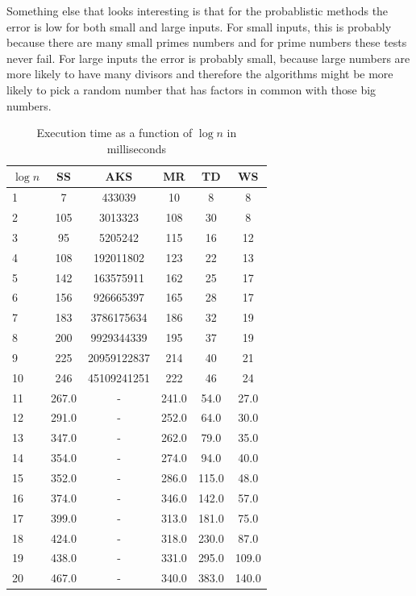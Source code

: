 Something else that looks interesting is that for the probablistic methods the error is low for both small and large inputs.
For small inputs, this is probably because there are many small primes numbers and for prime numbers these tests never fail. %
For large inputs the error is probably small, because large numbers are more likely to have many divisors and therefore the algorithms might be more likely to pick a random number that has factors in common with those big numbers.

\begin{table}
    \centering
    \caption{Execution time as a function of $\log n$ in milliseconds}
    \begin{tabular}{|l|c|c|c|c|c|} \hline
        $\log n$ & SS & AKS & MR & TD & WS \\
        \hline
1 & 7 & 433039 & 10 & 8 & 8 \\
2 & 105 & 3013323 & 108 & 30 & 8 \\
3 & 95 & 5205242 & 115 & 16 & 12 \\
4 & 108 & 192011802 & 123 & 22 & 13 \\
5 & 142 & 163575911 & 162 & 25 & 17 \\
6 & 156 & 926665397 & 165 & 28 & 17 \\
7 & 183 & 3786175634 & 186 & 32 & 19 \\
8 & 200 & 9929344339 & 195 & 37 & 19 \\
9 & 225 & 20959122837 & 214 & 40 & 21 \\
10 & 246 & 45109241251 & 222 & 46 & 24 \\
11 & 267.0 & - & 241.0 & 54.0 & 27.0 \\
12 & 291.0 & - & 252.0 & 64.0 & 30.0 \\
13 & 347.0 & - & 262.0 & 79.0 & 35.0 \\
14 & 354.0 & - & 274.0 & 94.0 & 40.0 \\
15 & 352.0 & - & 286.0 & 115.0 & 48.0 \\
16 & 374.0 & - & 346.0 & 142.0 & 57.0 \\
17 & 399.0 & - & 313.0 & 181.0 & 75.0 \\
18 & 424.0 & - & 318.0 & 230.0 & 87.0 \\
19 & 438.0 & - & 331.0 & 295.0 & 109.0 \\
20 & 467.0 & - & 340.0 & 383.0 & 140.0 \\

\end{tabular}
\end{table}
